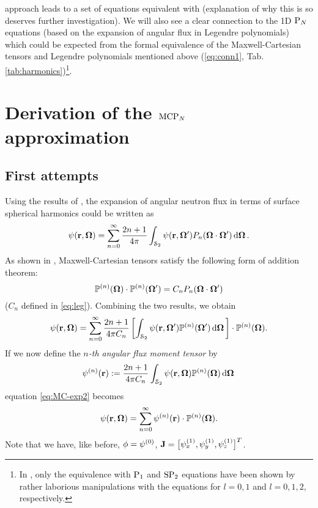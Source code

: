 approach leads to a set of equations equivalent with \cite[Eqn. (42)]{Coppa3} (explanation of why this is so deserves 
further investigation). We will also see a clear connection to the 1D $\PN$ equations (based on the expansion of angular 
flux in Legendre polynomials) which could be expected from the formal equivalence of the Maxwell-Cartesian tensors and 
Legendre polynomials mentioned above (\eqref{eq:conn1}, 
Tab. \ref{tab:harmonics})\footnote{In \cite{Coppa3}, only the equivalence with $\PN[1]$ and $\SPN[2]$ equations have 
been shown by rather laborious manipulations with the equations for $l = 0,1$ and $l = 0,1,2$, respectively.}.

\section{Derivation of the $\MCPN$ approximation}\label{sec:mcpn}
\subsection{First attempts}
Using the results of \cite[Art. 114]{Byerly}, the expansion of angular neutron flux in terms of surface spherical 
harmonics could be written as
\begin{equation}\label{eq:MC-exp1}
  \psi(\br,\bomega) = \suma[n]{0}{\infty}\frac{2n+1}{4\pi}\intA{\psi(\br,\bomega')P_n(\bomega\cdot\bomega')}.
\end{equation}
As shown in \cite[Sec. 7, Corollary II]{Applequist1}, Maxwell-Cartesian tensors satisfy the following form of 
addition theorem:
\begin{equation}\label{eq:MC-addition}
  \PP(\bomega)\contr\PP(\bomega') = C_n P_n(\bomega\cdot\bomega')
\end{equation}
($C_n$ defined in \eqref{eq:leg}). Combining the two results, we obtain
\begin{equation}\label{eq:MC-exp2}
  \psi(\br,\bomega) = \suma[n]{0}{\infty}\frac{2n+1}{4\pi C_n}\left[\intA{\psi(\br,\bomega')\PP(\bomega')}\right]\contr\PP(\bomega).
\end{equation}
If we now define the \textit{$n$-th angular flux moment tensor} by
\begin{equation}\label{eq:flux-moment}
  \fmom(\br) := \frac{2n+1}{4\pi C_n}\intA{\psi(\br,\bomega)\PP(\bomega)}
\end{equation}
equation \eqref{eq:MC-exp2} becomes
\begin{equation}\label{eq:MC-exp3}
  \psi(\br,\bomega) = \suma[n]{0}{\infty}\fmom(\br)\contr\PP(\bomega).
\end{equation}
Note that we have, like before, $\phi = \fmom[0]$, $\mathbf{J} = \bigl[\fmom[1]_x,\fmom[1]_y,\fmom[1]_z\bigr]^T$.

